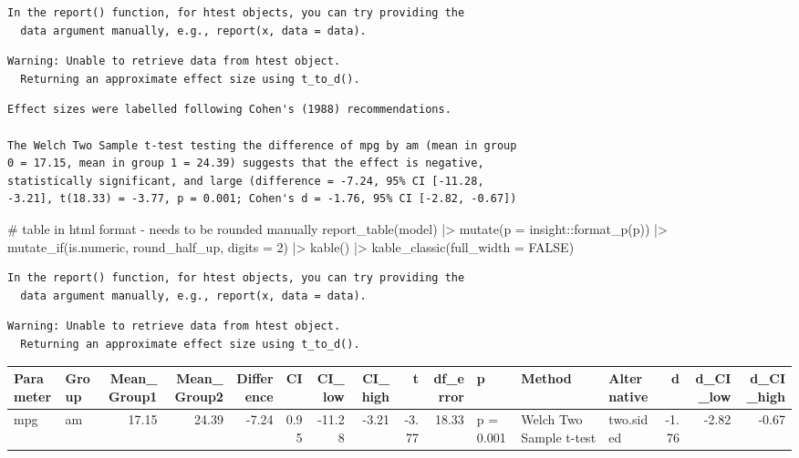 \documentclass[
  letterpaper,
  DIV=11,
  numbers=noendperiod]{scrreprt}
\newenvironment{Shaded}{\begin{snugshade}}{\end{snugshade}}
\newcommand{\AttributeTok}[1]{\textcolor[rgb]{0.40,0.45,0.13}{#1}}
\newcommand{\CommentTok}[1]{\textcolor[rgb]{0.37,0.37,0.37}{#1}}
\newcommand{\ConstantTok}[1]{\textcolor[rgb]{0.56,0.35,0.01}{#1}}
\newcommand{\DecValTok}[1]{\textcolor[rgb]{0.68,0.00,0.00}{#1}}
\newcommand{\FunctionTok}[1]{\textcolor[rgb]{0.28,0.35,0.67}{#1}}
\newcommand{\NormalTok}[1]{\textcolor[rgb]{0.00,0.23,0.31}{#1}}
\newcommand{\SpecialCharTok}[1]{\textcolor[rgb]{0.37,0.37,0.37}{#1}}
\begin{document}
\begin{verbatim}
In the report() function, for htest objects, you can try providing the
  data argument manually, e.g., report(x, data = data).
\end{verbatim}

\begin{verbatim}
Warning: Unable to retrieve data from htest object.
  Returning an approximate effect size using t_to_d().
\end{verbatim}

\begin{verbatim}
Effect sizes were labelled following Cohen's (1988) recommendations.

The Welch Two Sample t-test testing the difference of mpg by am (mean in group
0 = 17.15, mean in group 1 = 24.39) suggests that the effect is negative,
statistically significant, and large (difference = -7.24, 95% CI [-11.28,
-3.21], t(18.33) = -3.77, p = 0.001; Cohen's d = -1.76, 95% CI [-2.82, -0.67])
\end{verbatim}

\begin{Shaded}
\begin{Highlighting}[]
\CommentTok{\# table in html format {-} needs to be rounded manually}
\FunctionTok{report\_table}\NormalTok{(model) }\SpecialCharTok{|\textgreater{}}
  \FunctionTok{mutate}\NormalTok{(}\AttributeTok{p =}\NormalTok{ insight}\SpecialCharTok{::}\FunctionTok{format\_p}\NormalTok{(p)) }\SpecialCharTok{|\textgreater{}}
  \FunctionTok{mutate\_if}\NormalTok{(is.numeric, round\_half\_up, }\AttributeTok{digits =} \DecValTok{2}\NormalTok{) }\SpecialCharTok{|\textgreater{}}
  \FunctionTok{kable}\NormalTok{() }\SpecialCharTok{|\textgreater{}}
  \FunctionTok{kable\_classic}\NormalTok{(}\AttributeTok{full\_width =} \ConstantTok{FALSE}\NormalTok{)}
\end{Highlighting}
\end{Shaded}

\begin{verbatim}
In the report() function, for htest objects, you can try providing the
  data argument manually, e.g., report(x, data = data).
\end{verbatim}

\begin{verbatim}
Warning: Unable to retrieve data from htest object.
  Returning an approximate effect size using t_to_d().
\end{verbatim}

\begin{longtable*}[t]{llrrrrrrrrlllrrr}
\toprule
Parameter & Group & Mean\_Group1 & Mean\_Group2 & Difference & CI & CI\_low & CI\_high & t & df\_error & p & Method & Alternative & d & d\_CI\_low & d\_CI\_high\\
\midrule
mpg & am & 17.15 & 24.39 & -7.24 & 0.95 & -11.28 & -3.21 & -3.77 & 18.33 & p = 0.001 & Welch Two Sample t-test & two.sided & -1.76 & -2.82 & -0.67\\
\bottomrule
\end{longtable*}
\end{document}
